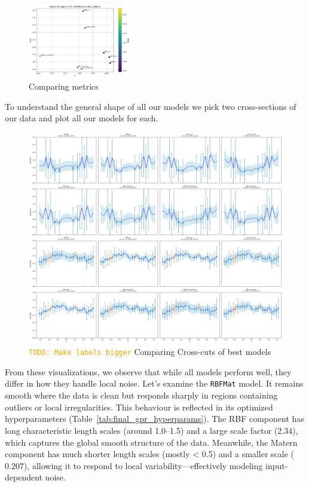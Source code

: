 \documentclass[12pt]{article}
\newcommand{\todo}[1]{\textcolor{orange}{\texttt{TODO: #1}}}
\begin{document}
\begin{figure}[H]
    \centering
    \includegraphics[width=0.4\textwidth]{LatexPlots/final_gps_plots/metric_of_finalists_comparison.png}
    \caption{Comparing metrics}
    \label{fig:comparing_metrics}
\end{figure}
\noindent
To understand the general shape of all our models we pick two cross-sections of our data and plot all our models for each.
\begin{figure}[H]
    \centering
    \includegraphics[width=1\textwidth]{LatexPlots/final_gps_plots/gps_crosscuts_bestmodels.png}
    \caption{\todo{Make labels bigger} Comparing Cross-cuts of best models}
    \label{fig:crosscuts_bestmodels}
\end{figure}

\noindent
From these visualizations, we observe that while all models perform well, they differ in how they handle local noise.
Let's examine the \texttt{RBFMat} model. It remains smooth where the data is clean but responds sharply in regions containing outliers or local irregularities.
This behaviour is reflected in its optimized hyperparameters (Table~\ref{tab:final_gpr_hyperparams}). The RBF component has long characteristic length scales (around 1.0--1.5) and a large scale factor ($2.34$),
which captures the global smooth structure of the data. Meanwhile, the Matern component has much shorter length scales (mostly < 0.5) and a smaller scale ($0.207$), allowing it to respond to local variability—effectively modeling input-dependent noise.
\end{document}
